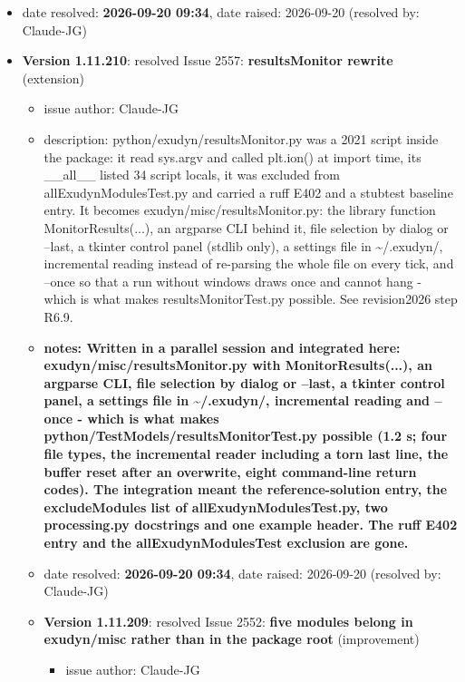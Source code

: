 \begin{itemize}
\begin{itemize}
\begin{itemize}
\begin{itemize}
\begin{itemize}
\begin{itemize}
\begin{itemize}
\begin{itemize}
\begin{itemize}
\begin{itemize}
\begin{itemize}
    \item   date resolved: {\bf 2026-09-20 09:34},
date raised: 2026-09-20 (resolved by: Claude-JG)
  \ei
  \item[] {\bf Version 1.11.210}:  resolved Issue 2557: {\bf resultsMonitor rewrite}
(extension)
\vspace{-6pt}   \begin{itemize} \setlength\itemsep{-1pt}
    \item issue author: Claude-JG
    \item {description: python/exudyn/resultsMonitor.py was a 2021 script inside the package: it read sys.argv and called plt.ion() at import time, its \_\_all\_\_ listed 34 script locals, it was excluded from allExudynModulesTest.py and carried a ruff E402 and a stubtest baseline entry. It becomes exudyn/misc/resultsMonitor.py: the library function MonitorResults(...), an argparse CLI behind it, file selection by dialog or --last, a tkinter control panel (stdlib only), a settings file in \textasciitilde{}/.exudyn/, incremental reading instead of re-parsing the whole file on every tick, and --once so that a run without windows draws once and cannot hang - which is what makes resultsMonitorTest.py possible. See revision2026 step R6.9.}
    \item {\bf notes: Written in a parallel session and integrated here: exudyn/misc/resultsMonitor.py with MonitorResults(...), an argparse CLI, file selection by dialog or --last, a tkinter control panel, a settings file in \textasciitilde{}/.exudyn/, incremental reading and --once - which is what makes python/TestModels/resultsMonitorTest.py possible (1.2 s; four file types, the incremental reader including a torn last line, the buffer reset after an overwrite, eight command-line return codes). The integration meant the reference-solution entry, the excludeModules list of allExudynModulesTest.py, two processing.py docstrings and one example header. The ruff E402 entry and the allExudynModulesTest exclusion are gone.}
    \item   date resolved: {\bf 2026-09-20 09:34},
date raised: 2026-09-20 (resolved by: Claude-JG)
  \ei
  \item[] {\bf Version 1.11.209}:  resolved Issue 2552: {\bf five modules belong in exudyn/misc rather than in the package root}
(improvement)
\vspace{-6pt}   \begin{itemize} \setlength\itemsep{-1pt}
    \item issue author: Claude-JG

\end{itemize}
\end{itemize}
\end{itemize}
\end{itemize}
\end{itemize}
\end{itemize}
\end{itemize}
\end{itemize}
\end{itemize}
\end{itemize}
\end{itemize}
\end{itemize}
\end{itemize}
